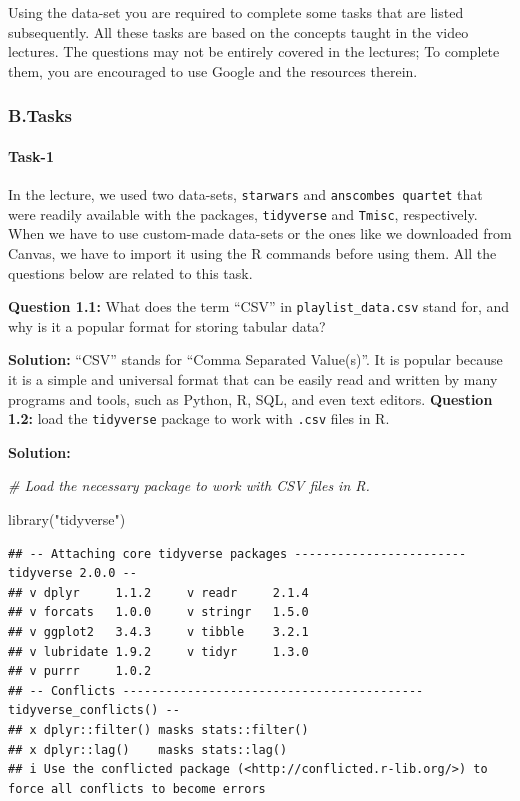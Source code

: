 \documentclass[
]{article}
\newenvironment{Shaded}{\begin{snugshade}}{\end{snugshade}}
\newcommand{\CommentTok}[1]{\textcolor[rgb]{0.56,0.35,0.01}{\textit{#1}}}
\newcommand{\FunctionTok}[1]{\textcolor[rgb]{0.00,0.00,0.00}{#1}}
\newcommand{\NormalTok}[1]{#1}
\newcommand{\StringTok}[1]{\textcolor[rgb]{0.31,0.60,0.02}{#1}}
\begin{document}
Using the data-set you are required to complete some tasks that are
listed subsequently. All these tasks are based on the concepts taught in
the video lectures. The questions may not be entirely covered in the
lectures; To complete them, you are encouraged to use Google and the
resources therein.

\hypertarget{b.tasks}{%
\subsubsection{B.Tasks}\label{b.tasks}}

\hypertarget{task-1}{%
\paragraph{Task-1}\label{task-1}}

In the lecture, we used two data-sets, \texttt{starwars} and
\texttt{anscombe\textquotesingle{}s\ quartet} that were readily
available with the packages, \texttt{tidyverse} and \texttt{Tmisc},
respectively. When we have to use custom-made data-sets or the ones like
we downloaded from Canvas, we have to import it using the R commands
before using them. All the questions below are related to this task.

\textbf{Question 1.1:} What does the term ``CSV'' in
\texttt{playlist\_data.csv} stand for, and why is it a popular format
for storing tabular data?

\textbf{Solution:} ``CSV'' stands for ``Comma Separated Value(s)''. It
is popular because it is a simple and universal format that can be
easily read and written by many programs and tools, such as Python, R,
SQL, and even text editors. \textbf{Question 1.2:} load the
\texttt{tidyverse} package to work with \texttt{.csv} files in R.

\textbf{Solution:}

\begin{Shaded}
\begin{Highlighting}[]
\CommentTok{\# Load the necessary package to work with CSV files in R.}

\FunctionTok{library}\NormalTok{(}\StringTok{"tidyverse"}\NormalTok{)}
\end{Highlighting}
\end{Shaded}

\begin{verbatim}
## -- Attaching core tidyverse packages ------------------------ tidyverse 2.0.0 --
## v dplyr     1.1.2     v readr     2.1.4
## v forcats   1.0.0     v stringr   1.5.0
## v ggplot2   3.4.3     v tibble    3.2.1
## v lubridate 1.9.2     v tidyr     1.3.0
## v purrr     1.0.2     
## -- Conflicts ------------------------------------------ tidyverse_conflicts() --
## x dplyr::filter() masks stats::filter()
## x dplyr::lag()    masks stats::lag()
## i Use the conflicted package (<http://conflicted.r-lib.org/>) to force all conflicts to become errors
\end{verbatim}
\end{document}
